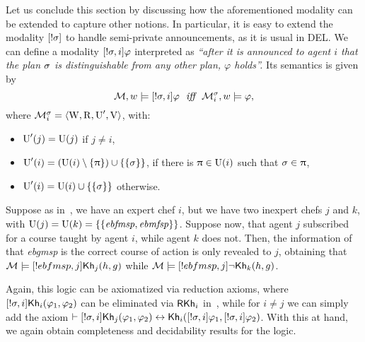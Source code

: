 \medskip 

Let us conclude this section by discussing how the aforementioned modality can be extended to capture other notions. In particular, it is easy to extend the modality $[!\sigma]$ to handle semi-private announcements, as it is usual in DEL. We can define a modality  $[!\sigma,i]\varphi$ interpreted as \emph{``after it is announced to agent $i$ that the plan $\sigma$ is distinguishable from any other plan, $\varphi$ holds''.} Its semantics is given by 
\[
    \modults,w \models \srefbox{\plan,i}\varphi \ \ \iff \ \ \modults^\plan_i,w \models \varphi,
\]
where $\mathcal{M}^\sigma_i = \langle \operatorname{W},\operatorname{R},\operatorname{U}',\operatorname{V} \rangle$, with:
\begin{itemize}
\item $\operatorname{U}'(j) = \operatorname{U}(j)$ if $j \neq i$,
\item $\operatorname{U}'(i) = (\operatorname{U}(i) \setminus \{ \uppi \}) \cup \{ \{ \sigma \} \}$, if there is $\uppi \in \operatorname{U}(i)$ such that $\sigma \in \uppi$,
\item $\operatorname{U}'(i) = \operatorname{U}(i) \cup \{ \{ \sigma \} \}$ otherwise.
\end{itemize}   

\medskip 

\begin{example}
Suppose as in~, we have an expert chef $i$, but we have two inexpert chefs $j$ and $k$, with $\operatorname{U}(j)=\operatorname{U}(k)=\{ \{ \mathit{ebfmsp},\mathit{ebmfsp} \} \}$. Suppose now, that agent $j$ subscribed for a course taught by agent $i$, while agent $k$ does not. Then, the information of that \textit{ebgmsp} is the correct course of action is only revealed to $j$, obtaining that $\mathcal{M}\models[!ebfmsp,j]{\sf Kh}_j(h,g)$ while $\mathcal{M}\models[!ebfmsp,j]\neg{\sf Kh}_k(h,g)$.
\end{example}

\medskip 

Again, this logic can be axiomatized via reduction axioms, where $[!\sigma,i]{\sf Kh}_i(\varphi_1,\varphi_2)$ can be eliminated via $\textsf{RKh}_i$ in~, while for $i\neq j$ we can simply add the axiom $\vdash [!\sigma,i] {\sf Kh}_j(\varphi_1,\varphi_2) \leftrightarrow {\sf Kh}_i([!\sigma,i] \varphi_1,[!\sigma,i] \varphi_2)$. 
With this at hand, we again obtain completeness and decidability results for the logic.
